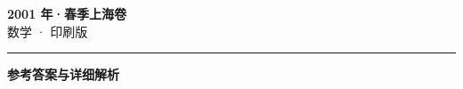 \documentclass[zihao=5, a4paper]{ctexart}
\begin{document}
\begin{center}
  {\Large\bfseries 2001 年·春季上海卷}\\[4pt]
  {\large 数学 · 印刷版}
\end{center}
\medskip
{}

\par\bigskip\hrule\bigskip
{}
\begin{center}{\large\bfseries 参考答案与详细解析}\end{center}
\smallskip

\end{document}
